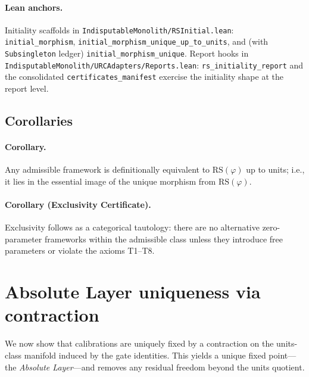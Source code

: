 \documentclass[11pt]{article}
\begin{document}
\paragraph{Lean anchors.} Initiality scaffolds in \texttt{IndisputableMonolith/RSInitial.lean}: \texttt{initial\_morphism}, \texttt{initial\_morphism\_unique\_up\_to\_units}, and (with \texttt{Subsingleton} ledger) \texttt{initial\_morphism\_unique}. Report hooks in \texttt{IndisputableMonolith/URCAdapters/Reports.lean}: \texttt{rs\_initiality\_report} and the consolidated \texttt{certificates\_manifest} exercise the initiality shape at the report level.

\subsection{Corollaries}
\paragraph{Corollary.} Any admissible framework is definitionally equivalent to \(\mathrm{RS}(\varphi)\) up to units; i.e., it lies in the essential image of the unique morphism from \(\mathrm{RS}(\varphi)\).

\paragraph{Corollary (Exclusivity Certificate).} Exclusivity follows as a categorical tautology: there are no alternative zero\mbox{-}parameter frameworks within the admissible class unless they introduce free parameters or violate the axioms T1--T8.

\section{Absolute Layer uniqueness via contraction}
We now show that calibrations are uniquely fixed by a contraction on the units\mbox{-}class manifold induced by the gate identities. This yields a unique fixed point---the \emph{Absolute Layer}---and removes any residual freedom beyond the units quotient.
\end{document}
